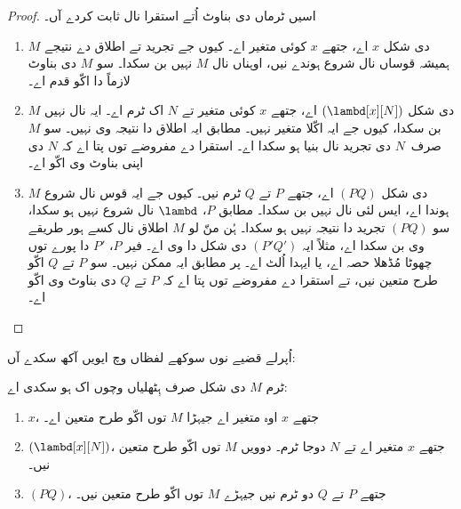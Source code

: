 \documentclass[../../../include/open-logic-section]{subfiles}
\begin{document}
\begin{proof}
اسیں ٹرماں دی بناوٹ اُتے استقرا نال ثابت کردے آں۔
\begin{enumerate}
  \item $M$ دی شکل $x$ اے، جتھے $x$ کوئی متغیر اے۔ کیوں جے
    تجرید تے اطلاق دے نتیجے ہمیشہ قوساں نال شروع ہوندے نیں،
    اوہناں نال $M$ نہیں بن سکدا۔ سو $M$ دی بناوٹ لازماً
     دا اکّو قدم اے۔
  \item $M$ دی شکل $(\lambd[x][N])$ اے، جتھے $x$ کوئی متغیر
    تے $N$ اک ٹرم اے۔ ایہ 
    نال نہیں بن سکدا، کیوں جے ایہ اکّلا متغیر نہیں۔
     مطابق ایہ اطلاق دا نتیجہ وی نہیں۔
    سو $M$ صرف~$N$ دی تجرید نال بنیا ہو سکدا اے۔ استقرا دے مفروضے
    توں پتا اے کہ $N$ دی اپنی بناوٹ وی اکّو اے۔
  \item $M$ دی شکل $(PQ)$ اے، جتھے $P$ تے $Q$ ٹرم نیں۔
    کیوں جے ایہ قوس نال شروع ہوندا اے، ایس لئی
     نال نہیں
    بن سکدا۔  مطابق $P$، $\lambd$ نال
    شروع نہیں ہو سکدا، سو $(PQ)$ تجرید دا نتیجہ نہیں ہو سکدا۔
    ہُن منّ لو $M$ اطلاق نال کسے ہور طریقے وی بن سکدا اے،
    مثلاً ایہ $(P'Q')$ دی شکل دا وی اے۔ فیر $P$، $P'$ دا
    پورے توں چھوٹا مُڈھلا حصہ اے، یا ایہدا اُلٹ اے۔ پر
     مطابق ایہ ممکن نہیں۔ سو $P$ تے $Q$
    اکّو طرح متعین نیں، تے استقرا دے مفروضے توں پتا اے کہ
    $P$ تے $Q$ دی بناوٹ وی اکّو اے۔
\end{enumerate}
\end{proof}

اُپرلے قضیے نوں سوکھے لفظاں وچ ایویں آکھ سکدے آں:
\begin{prop}
  ٹرم $M$ دی شکل صرف ہِٹھلیاں وچوں اک ہو سکدی اے:
  \begin{enumerate}
    \item $x$، جتھے $x$ اوہ متغیر اے جیہڑا $M$ توں اکّو طرح متعین اے۔
    \item $(\lambd[x][N])$، جتھے $x$ متغیر اے تے $N$ دوجا ٹرم۔
      دوویں $M$ توں اکّو طرح متعین نیں۔
    \item $(PQ)$، جتھے $P$ تے $Q$ دو ٹرم نیں جیہڑے $M$ توں
      اکّو طرح متعین نیں۔
  \end{enumerate}
\end{prop}
\end{document}
